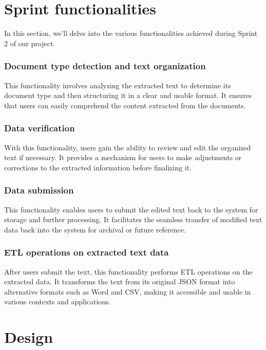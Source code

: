 \section{Sprint functionalities}
In this section, we'll delve into the various functionalities achieved during Sprint 2 of our project.

\subsubsection{Document type detection and text organization}

This functionality involves analyzing the extracted text to determine its document type and then structuring it in a clear and usable format. It ensures that users can easily comprehend the content extracted from the documents.

\subsubsection{Data verification}

With this functionality, users gain the ability to review and edit the organized text if necessary. It provides a mechanism for users to make adjustments or corrections to the extracted information before finalizing it.

\subsubsection{Data submission}

This functionality enables users to submit the edited text back to the system for storage and further processing. It facilitates the seamless transfer of modified text data back into the system for archival or future reference.

\subsubsection{ETL operations on extracted text data}

After users submit the text, this functionality performs ETL operations on the extracted data. It transforms the text from its original JSON format into alternative formats such as Word and CSV, making it accessible and usable in various contexts and applications.



\section{Design}

